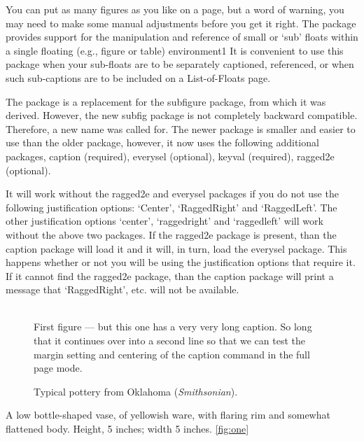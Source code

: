 You can put as many figures as you like on a page, but a word of warning, you may need to make some manual adjustments before you get it right. The package provides support for the manipulation and reference of small or ‘sub’ floats within a single floating (e.g., figure or table) environment1 It is convenient to use this
package when your sub-floats are to be separately captioned, referenced, or when such
sub-captions are to be included on a List-of-Floats page.

The package is a replacement for the subfigure package, from which it was derived.
However, the new subfig package is not completely backward compatible.
Therefore, a new name was called for. The newer package is smaller and easier to use
than the older package, however, it now uses the following additional packages, 
caption (required), 
everysel (optional), 
keyval (required), 
ragged2e (optional).

It will work without the ragged2e and everysel packages if you do not use the following
justification options: ‘Center’, ‘RaggedRight’ and ‘RaggedLeft’. The other justification
options ‘center’, ‘raggedright’ and ‘raggedleft’ will work without the above two packages. If the ragged2e package is present, than the caption package will load it and it
will, in turn, load the everysel package. This happens whether or not you will be using
the justification options that require it. If it cannot find the ragged2e package, than the
caption package will print a message that ‘RaggedRight’, etc. will not be available.
\clearpage

\begin{figure}%
    \captionsetup[figure]{margin=3pt}%
    \hfill
     \\[-10pt]
    \caption{First figure --- but this one has a very very long caption.
     So long that it continues over into a second line so that we can 
     test the margin setting and centering of the caption command in the
     full page mode.}%
    \label{fig:Afirst}%
    \caption{Typical pottery from Oklahoma (\emph{Smithsonian}).}%
    \label{fig:Athird}%
\end{figure}

 A low bottle-shaped vase, of yellowish ware, with flaring rim and somewhat flattened body. Height, 5 inches; width 5 inches. \ref{fig:one}

